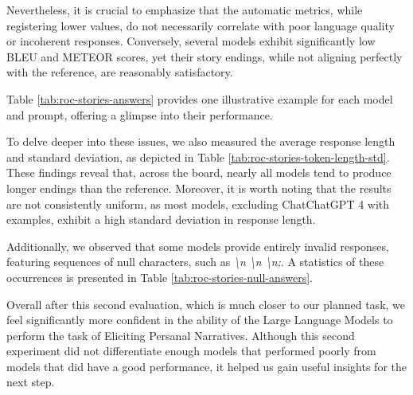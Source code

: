 Nevertheless, it is crucial to emphasize that the automatic metrics, while registering lower values, do not necessarily correlate with poor language quality or incoherent responses. Conversely, several models exhibit significantly low BLEU and METEOR scores, yet their story endings, while not aligning perfectly with the reference, are reasonably satisfactory.

Table \ref{tab:roc-stories-answers} provides one illustrative example for each model and prompt, offering a glimpse into their performance.

% 
To delve deeper into these issues, we also measured the average response length and standard deviation, as depicted in Table \ref{tab:roc-stories-token-length-std}. These findings reveal that, across the board, nearly all models tend to produce longer endings than the reference. Moreover, it is worth noting that the results are not consistently uniform, as most models, excluding ChatChatGPT 4 with examples, exhibit a high standard deviation in response length.


Additionally, we observed that some models provide entirely invalid responses, featuring sequences of null characters, such as \emph{\textbackslash n \textbackslash n \textbackslash n;}. A statistics of these occurrences is presented in Table \ref{tab:roc-stories-null-answers}.

Overall after this second evaluation, which is much closer to our planned task, we feel significantly more confident in the ability of the Large Language Models to perform the task of Eliciting Persanal Narratives. Although this second experiment did not differentiate enough models that performed poorly from models that did have a good performance, it helped us gain useful insights for the next step.

